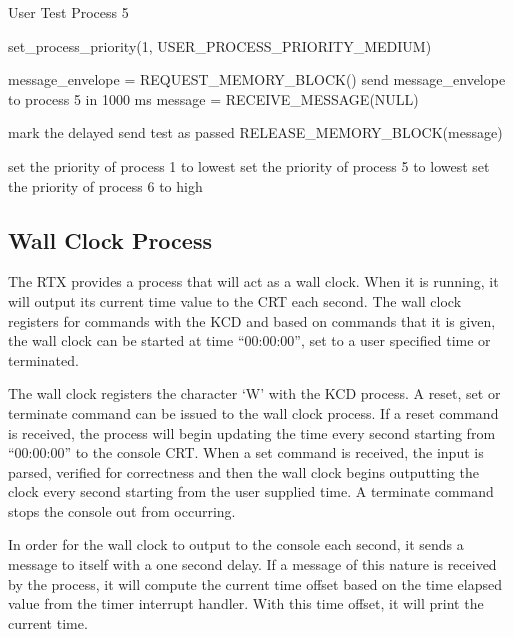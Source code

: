 \documentclass[12pt]{report}
\begin{document}
\begin{algorithm}
  \caption{User Test Process 5}
  \begin{algorithmic}[1]
      \State set\_process\_priority(1, USER\_PROCESS\_PRIORITY\_MEDIUM)

      \State message\_envelope = REQUEST\_MEMORY\_BLOCK()
      \State send message\_envelope to process 5 in 1000 ms
      \State message = RECEIVE\_MESSAGE(NULL)

        \State mark the delayed send test as passed
      \EndIf
      \State RELEASE\_MEMORY\_BLOCK(message)

      \State set the priority of process 1 to lowest
      \State set the priority of process 5 to lowest
      \State set the priority of process 6 to high
      \EndWhile
    \EndFunction
  \end{algorithmic}
\end{algorithm}

\subsection{Wall Clock Process}
\label{sec:wall_clock_process}
    The RTX provides a process that will act as a wall clock. When it is running, it will output its current time value to the CRT each second. The wall clock registers for commands with the KCD and based on commands that it is given, the wall clock can be started at time “00:00:00”, set to a user specified time or terminated.

  The wall clock registers the character ‘W’ with the KCD process. A reset, set or terminate command can be issued to the wall clock process. If a reset command is received, the process will begin updating the time every second starting from “00:00:00” to the console CRT. When a set command is received, the input is parsed, verified for correctness and then the wall clock begins outputting the clock every second starting from the user supplied time. A terminate command stops the console out from occurring.

  In order for the wall clock to output to the console each second, it sends a message to itself with a one second delay. If a message of this nature is received by the process, it will compute the current time offset based on the time elapsed value from the timer interrupt handler. With this time offset, it will print the current time.
\end{document}
